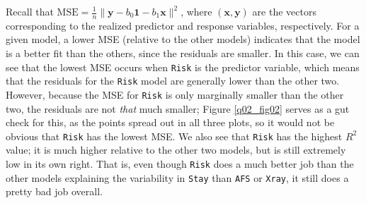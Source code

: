 \documentclass[10pt]{article}
\begin{document}
\begin{itemize}
\begin{table}
    \end{table}
    Recall that \(\mathrm{MSE} = \frac{1}{n}\|\mathbf{y} - b_0 \mathbf{1} - b_1 \mathbf{x}\|^2\), where \((\mathbf{x},\mathbf{y})\) are the vectors 
    corresponding 
    to the realized predictor and response variables, respectively. For a given model, a lower MSE (relative to the other models) indicates that the model is 
    a better fit than the others, since the residuals are smaller. In this case, we can see that the lowest MSE occurs when \texttt{Risk} is the predictor
    variable, which means that the residuals for the \texttt{Risk} model are generally lower than the other two. However, because the MSE for \texttt{Risk}
    is only marginally smaller than the other two, the residuals are not \textit{that} much smaller; Figure \ref{q02_fig02} serves as a gut check for this, 
    as the points spread out in all three plots, so it would not be obvious that \texttt{Risk} has the lowest MSE. We also see that \texttt{Risk} has the 
    highest \(R^2\) value; it is much higher relative to the other two models, but is still extremely low in its own right. That is, even though 
    \texttt{Risk} does a much better job than the other models explaining the variability in \texttt{Stay} than \texttt{AFS} or \texttt{Xray}, it still does 
    a pretty bad job overall. 
\end{itemize}

\end{document}
